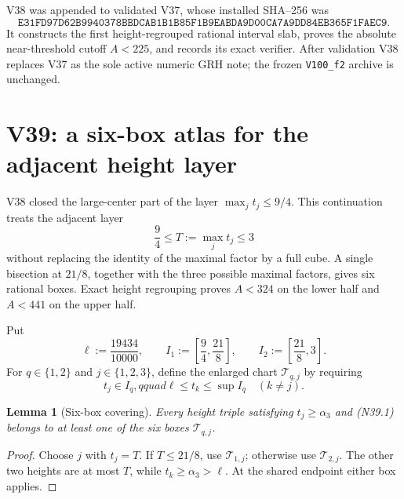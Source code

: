\documentclass[11pt]{article}
\newtheorem{lemma}[theorem]{Lemma}
\theoremstyle{definition}
\theoremstyle{remark}
\begin{document}
V38 was appended to validated V37, whose installed SHA--256 was
\[
 \texttt{E31FD97D62B9940378BBDCAB1B1B85F1B9EABDA9D00CA7A9DD84EB365F1FAEC9}.
\tag{N38.15}
\]
It constructs the first height-regrouped rational interval slab, proves
the absolute near-threshold cutoff \(A<225\), and records its exact
verifier.  After validation V38 replaces V37 as the sole active numeric
GRH note; the frozen \texttt{V100\_f2} archive is unchanged.



\section{V39: a six-box atlas for the adjacent height layer}
\label{sec:f2v39-adjacent-atlas}

V38 closed the large-center part of the layer
\(\max_jt_j\leq9/4\).  This continuation treats the adjacent layer
\[
 \frac94\leq T:=\max_jt_j\leq3
\tag{N39.1}
\]
without replacing the identity of the maximal factor by a full cube.  A
single bisection at \(21/8\), together with the three possible maximal
factors, gives six rational boxes.  Exact height regrouping proves
\(A<324\) on the lower half and \(A<441\) on the upper half.

Put
\[
 \ell:=\frac{19434}{10000},\qquad
 I_1:=\left[\frac94,\frac{21}{8}\right],
 \qquad I_2:=\left[\frac{21}{8},3\right].
\tag{N39.2}
\]
For \(q\in\{1,2\}\) and \(j\in\{1,2,3\}\), define the enlarged chart
\(\mathcal T_{q,j}\) by requiring
\[
 t_j\in I_q,qquad
 \ell\leq t_k\leq\sup I_q\quad(k\neq j).
\tag{N39.3}
\]

\begin{lemma}[Six-box covering]
\label{lem:f2v39-cover}
Every height triple satisfying \(t_j\geq\alpha_3\) and
\textup{(N39.1)} belongs to at least one of the six boxes
\(\mathcal T_{q,j}\).
\end{lemma}

\begin{proof}
Choose \(j\) with \(t_j=T\).  If \(T\leq21/8\), use
\(\mathcal T_{1,j}\); otherwise use \(\mathcal T_{2,j}\).  The other
two heights are at most \(T\), while
\(t_k\geq\alpha_3>\ell\).  At the shared endpoint either box applies.
\end{proof}
\end{document}
